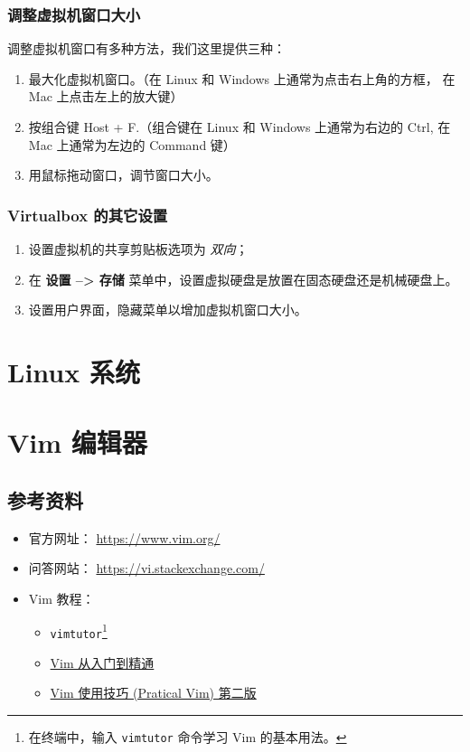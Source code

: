\documentclass[
    11pt,
    cite=authoryear,
    device=phone,
    lang=cn,
    mode=simple,
    result=answer,
    toc=onecol,
]{elegantbook_sierxue}
\begin{document}
\subsubsection{调整虚拟机窗口大小}%
\label{ssub:vbox-set-window-size}

调整虚拟机窗口有多种方法，我们这里提供三种：
\begin{enumerate}
    \item 最大化虚拟机窗口。（在 Linux 和 Windows 上通常为点击右上角的方框，
        在 Mac 上点击左上的放大键）
    \item 按组合键 Host + F.（组合键在 Linux 和 Windows 上通常为右边的
        Ctrl, 在 Mac 上通常为左边的 Command 键）
    \item 用鼠标拖动窗口，调节窗口大小。
\end{enumerate}

\subsubsection{Virtualbox 的其它设置}%
\label{ssub:vbox-others}
\begin{enumerate}
    \item 设置虚拟机的共享剪贴板选项为 \emph{双向}；
    \item 在 \textbf{设置 --> 存储}
        菜单中，设置虚拟硬盘是放置在固态硬盘还是机械硬盘上。
    \item 设置用户界面，隐藏菜单以增加虚拟机窗口大小。
\end{enumerate}

\newpage
\section{Linux 系统}%
\label{sec:linux}
\newpage
\section{Vim 编辑器}%
\label{sec:vim}

\subsection{参考资料}%
\label{sub:vim-refs}

\begin{itemize}
    \item 官方网址： \href{https://www.vim.org/}{https://www.vim.org/}
    \item 问答网站：
        \href{https://vi.stackexchange.com/}{https://vi.stackexchange.com/}
    \item Vim 教程：
        \begin{itemize}
            \item \lstinline{vimtutor}\footnote{
                在终端中，输入 \lstinline{vimtutor} 命令学习 Vim
                的基本用法。}
            \item \href{https://github.com/wsdjeg/vim-galore-zh_cn}
                {Vim 从入门到精通}
            \item \href{https://item.jd.com/12056490.html}
                {Vim 使用技巧 (Pratical Vim) 第二版}
        \end{itemize}
\end{itemize}
\end{document}
